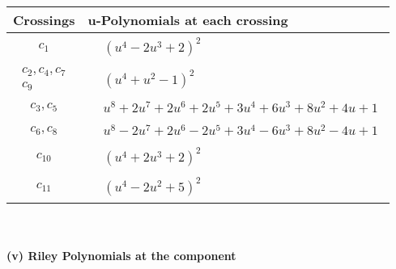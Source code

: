 \documentclass[1p]{elsarticle_modified}
\theoremstyle{definition}
\begin{document}
\begin{tabular}{m{50pt}|m{274pt}}
Crossings & \hspace{64pt}u-Polynomials at each crossing \\
\hline $$\begin{aligned}c_{1}\end{aligned}$$&$\begin{aligned}
&(u^4-2 u^3+2)^2
\end{aligned}$\\
\hline $$\begin{aligned}c_{2},c_{4},c_{7}\\c_{9}\end{aligned}$$&$\begin{aligned}
&(u^4+u^2-1)^2
\end{aligned}$\\
\hline $$\begin{aligned}c_{3},c_{5}\end{aligned}$$&$\begin{aligned}
&u^8+2 u^7+2 u^6+2 u^5+3 u^4+6 u^3+8 u^2+4 u+1
\end{aligned}$\\
\hline $$\begin{aligned}c_{6},c_{8}\end{aligned}$$&$\begin{aligned}
&u^8-2 u^7+2 u^6-2 u^5+3 u^4-6 u^3+8 u^2-4 u+1
\end{aligned}$\\
\hline $$\begin{aligned}c_{10}\end{aligned}$$&$\begin{aligned}
&(u^4+2 u^3+2)^2
\end{aligned}$\\
\hline $$\begin{aligned}c_{11}\end{aligned}$$&$\begin{aligned}
&(u^4-2 u^2+5)^2
\end{aligned}$\\
\hline
\end{tabular}\\~\\
\newpage\renewcommand{\arraystretch}{1}
\flushleft \textbf{(v) Riley Polynomials at the component}\newline \\
\end{document}

